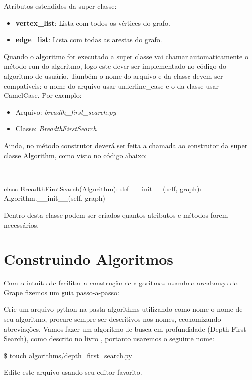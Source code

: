 \documentclass[a4paper]{abnt}
\begin{document}
Atributos estendidos da super classe:

\begin{itemize}
    \item \textbf{vertex\_list}: Lista com todos os vértices do grafo.
    \item \textbf{edge\_list}: Lista com todas as arestas do grafo.
\end{itemize}

Quando o algoritmo for executado a super classe vai chamar automaticamente o método run do algoritmo, logo este dever ser implementado no código do algoritmo de usuário. Também o nome do arquivo e da classe devem ser compatíveis: o nome do arquivo usar underline\_case e o da classe usar CamelCase. Por exemplo:

\begin{itemize}
    \item Arquivo: \textit{breadth\_first\_search.py}
    \item Classe: \textit{BreadthFirstSearch}
\end{itemize}

Ainda, no método construtor deverá ser feita a chamada ao construtor da super classe Algorithm, como visto no código abaixo:

\\
\begin{python}
class BreadthFirstSearch(Algorithm):
    def __init__(self, graph):
        Algorithm.__init__(self, graph)
\end{python}

Dentro desta classe podem ser criados quantos atributos e métodos forem necessários.

\section{Construindo Algoritmos}

Com o intuito de facilitar a construção de algoritmos usando o arcabouço do Grape fizemos um guia passo-a-passo:

Crie um arquivo python na pasta algorithms utilizando como nome o nome de seu algoritmo, procure sempre ser descritivos nos nomes, economizando abreviações. Vamos fazer um algoritmo de busca em profundidade (Depth-First Search), como descrito no livro \cite{cormen}, portanto usaremos o seguinte nome:

\$ touch algorithms/depth\_first\_search.py

Edite este arquivo usando seu editor favorito.
\end{document}
